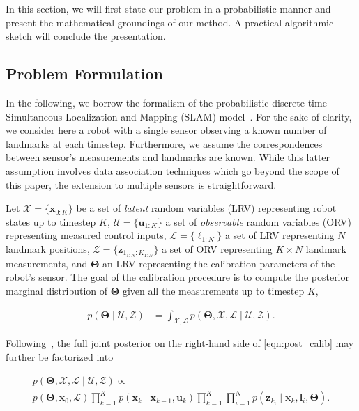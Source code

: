 In this section, we will first state our problem in a probabilistic manner and
present the mathematical groundings of our method. A practical algorithmic
sketch will conclude the presentation.

\subsection{Problem Formulation\label{subsec:prob}}

In the following, we borrow the formalism of the probabilistic discrete-time
Simultaneous Localization and Mapping (SLAM)
model~\cite{durrantwhyte06simultaneous}. For the sake of clarity, we
consider here a robot with a single sensor observing a known number of landmarks
at each timestep. Furthermore, we assume the correspondences between sensor's
measurements and landmarks are known. While this latter assumption involves data
association techniques which go beyond the scope of this paper, the extension to
multiple sensors is straightforward.

Let
$\mathcal{X}=\{\mathbf{x}_{0:K}\}$ be a set of \emph{latent} random variables
(LRV) representing robot states up to timestep $K$,
$\mathcal{U}=\{\mathbf{u}_{1:K}\}$ a set of \emph{observable} random variables
(ORV) representing measured control inputs,
$\mathcal{L}=\{\boldsymbol{\ell}_{1:N}\}$ a set of LRV representing $N$
landmark positions, $\mathcal{Z}=\{\mathbf{z}_{1_{1:N}:K_{1:N}}\}$ a set of ORV
representing $K \times N$ landmark measurements, and $\boldsymbol{\Theta}$ an
LRV representing the calibration parameters of the robot's sensor. The goal of
the calibration procedure is to compute the posterior marginal distribution of
$\boldsymbol{\Theta}$ given all the measurements up to timestep $K$,

\begin{equation}\label{eqn:post_calib}
  \begin{aligned}
  p(\boldsymbol{\Theta}\mid\mathcal{U},\mathcal{Z}) &=
    \int_{\mathcal{X}, \mathcal{L}}p(\boldsymbol{\Theta}, \mathcal{X},
    \mathcal{L} \mid\mathcal{U},\mathcal{Z}).
  \end{aligned}
\end{equation}

\noindent Following~\cite{durrantwhyte06simultaneous}, the full joint posterior
on the right-hand side of \eqref{eqn:post_calib} may further be factorized into

\begin{multline}\label{eqn:post_joint_factorized}
  p(\boldsymbol{\Theta}, \mathcal{X},
    \mathcal{L} \mid\mathcal{U},\mathcal{Z}) \propto\\
    p(\boldsymbol{\Theta}, \mathbf{x}_0,\mathcal{L})
    \prod_{k=1}^K p(\mathbf{x}_k\mid\mathbf{x}_{k - 1},\mathbf{u}_k)
    \prod_{k=1}^K\prod_{i=1}^N p(\mathbf{z}_{k_i}\mid\mathbf{x}_k,
    \mathbf{l}_i,\boldsymbol{\Theta}).
\end{multline}

